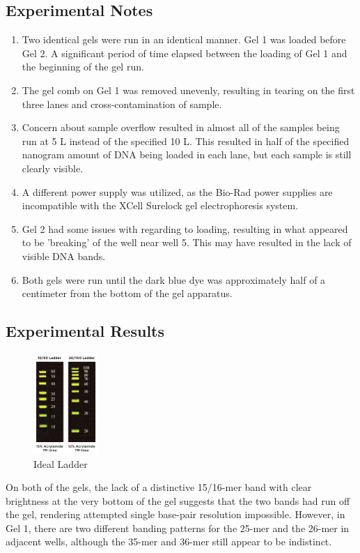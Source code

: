 \documentclass[letterpaper]{article}
\newcommand{\uL}{\micro{}L}
\begin{document}
\subsection{Experimental Notes}
\begin{enumerate}
\item{Two identical gels were run in an identical manner. Gel 1 was loaded before Gel 2. A significant period of time elapsed between the loading of Gel 1 and the beginning of the gel run.}
\item{The gel comb on Gel 1 was removed unevenly, resulting in tearing on the first three lanes and cross-contamination of sample.}
\item{Concern about sample overflow resulted in almost all of the samples being run at 5 \uL{} instead of the specified 10 \uL{}. This resulted in half of the specified nanogram amount of DNA being loaded in each lane, but each sample is still clearly visible.}
\item{A different power supply was utilized, as the Bio-Rad power supplies are incompatible with the XCell Surelock gel electrophoresis system.}
\item{Gel 2 had some issues with regarding to loading, resulting in what appeared to be 'breaking' of the well near well 5. This may have resulted in the lack of visible DNA bands.}
\item{Both gels were run until the dark blue dye was approximately half of a centimeter from the bottom of the gel apparatus.}
\end{enumerate}

\subsection{Experimental Results}
\begin{figure}
\centering
\includegraphics[height=1.5in]{1060_Ladder.jpg}
\caption{Ideal Ladder}
\label{Ideal Ladder}
\end{figure}
On both of the gels, the lack of a distinctive 15/16-mer band with clear brightness at the very bottom of the gel suggests that the two bands had run off the gel, rendering attempted single base-pair resolution impossible. However, in Gel 1, there are two different banding patterns for the 25-mer and the 26-mer in adjacent wells, although the 35-mer and 36-mer still appear to be indistinct. \\
\end{document}
